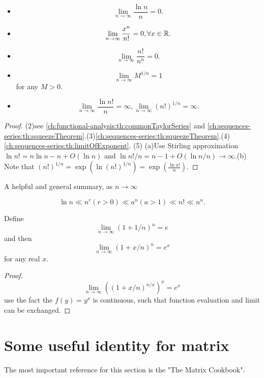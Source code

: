 \begin{refsection}
\begin{lemma}\label{appendix:th:commonLimitssummary}\hfill
\begin{itemize}
	\item $$\lim_{n\to \infty} \frac{\ln n}{n} = 0.$$
	\item 
	$$\lim_{n\to \infty} \frac{x^n}{n!} = 0, \forall x\in \mathbb{R}.$$
	\item 	$$\lim_{n\to\infty} \frac{n!}{n^n} = 0.$$
	\item $$\lim_{n\to \infty} M^{1/n} = 1$$ for any $M > 0$.
	\item $$\lim_{n\to\infty} \frac{\ln n!}{n} = \infty,\lim_{n\to\infty} (n!)^{1/n} = \infty.$$
\end{itemize}
\end{lemma}
\begin{proof}
(2)see \autoref{ch:functional-analysis:th:commonTaylorSeries} and \autoref{ch:sequences-series:th:squeezeTheorem}.(3)\autoref{ch:sequences-series:th:squeezeTheorem}.(4) \autoref{ch:sequences-series:th:limitOfExponent}.
(5) (a)Use Stirling approximation $\ln n! = n\ln n - n + O(\ln n)$ and $\ln n!/n = n - 1 + O(\ln n / n) \to \infty.$(b) Note that
 $(n!)^{1/n} = \exp(\ln (n!)^{1/n}) = \exp(\frac{\ln n!}{n}).$
\end{proof}

\begin{note}\label{appendix:th:sequenceGrowthRate}
A helpful and general summary, as $n\to \infty$

$$\ln n \ll n^r(r>0) \ll a^n (a>1) \ll n! \ll n^n.$$	
\end{note}


\begin{lemma}[property of e]\label{appendix:propertyofe}
Define
$$\lim_{n\to \infty} (1 + 1/n)^n = e$$
and then
$$\lim_{n\to \infty} (1 + x/n)^n = e^{x}$$
for any real $x$.
\end{lemma}
\begin{proof}
 $$\lim_{n\to \infty} ((1 + x/n)^{n/x})^x = e^{x}$$
use the fact the $f(y) = y^x$ is continuous, such that function evaluation and limit can be exchanged.	
\end{proof}



\section{Some useful identity for matrix}
\begin{remark}[references]
	The most important reference for this section is the "The Matrix Cookbook".\cite{petersen3274matrix}
\end{remark}


\end{refsection}
